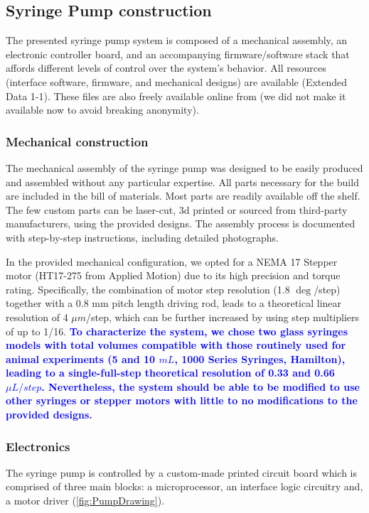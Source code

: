 \subsection*{Syringe Pump construction}
The presented syringe pump system is composed of a mechanical assembly, an electronic controller board, and an accompanying firmware/software stack that affords different levels of control over the system's behavior. All resources (interface software, firmware, and mechanical designs) are available (Extended Data 1-1). These files are also freely available online from (we did not make it available now to avoid breaking anonymity).

\subsubsection*{Mechanical construction}
The mechanical assembly of the syringe pump was designed to be easily produced and assembled without any particular expertise. All parts necessary for the build are included in the bill of materials. Most parts are readily available off the shelf.
The few custom parts can be laser-cut, 3d printed or sourced from third-party manufacturers, using the provided designs. The assembly process is documented with step-by-step instructions, including detailed photographs.

In the provided mechanical configuration, we opted for a NEMA 17 Stepper motor (HT17-275 from Applied Motion) due to its high precision and torque rating. Specifically, the combination of motor step resolution (1.8 $\deg$/step) together with a 0.8 mm pitch length driving rod, leads to a theoretical linear resolution of 4 $\mu m$/step, which can be further increased by using step multipliers of up to 1/16. \textcolor{blue}{\textbf{To characterize the system, we chose two glass syringes models with total volumes compatible with those routinely used for animal experiments (5 and 10 $mL$, 1000 Series Syringes, Hamilton), leading to a single-full-step theoretical resolution of 0.33 and 0.66 $\mu L / step$.
Nevertheless, the system should be able to be modified to use other syringes or stepper motors with little to no modifications to the provided designs.}}

\subsubsection*{Electronics}

The syringe pump is controlled by a custom-made printed circuit board which is comprised of three main blocks: a microprocessor, an interface logic circuitry and, a motor driver (\cref{fig:PumpDrawing}).

